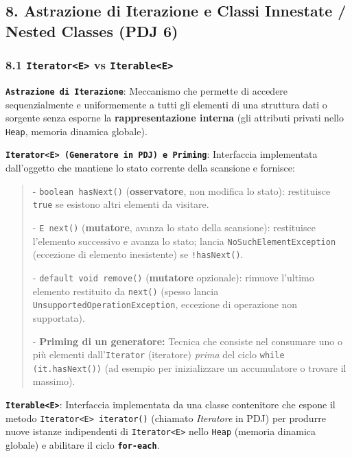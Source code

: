\subsection{8. Astrazione di Iterazione e Classi Innestate / Nested Classes (PDJ 6)}\label{8-astrazione-di-iterazione-e-classi-innestate-nested-classes-pdj-6}

\subsubsection{8.1 \texttt{Iterator<E>} vs \texttt{Iterable<E>}}\label{8-1-iterator-e-vs-iterable-e}

\textbf{\texttt{Astrazione di Iterazione}}: Meccanismo che permette di accedere sequenzialmente e uniformemente a tutti gli elementi di una struttura dati o sorgente senza esporne la \textbf{rappresentazione interna} (gli attributi privati nello \texttt{Heap}, memoria dinamica globale).

\textbf{\texttt{Iterator<E> (Generatore in PDJ) e Priming}}: Interfaccia implementata dall'oggetto che mantiene lo stato corrente della scansione e fornisce:

\begin{quote}\small



- \texttt{boolean hasNext()} (\textbf{osservatore}, non modifica lo stato): restituisce \texttt{true} se esistono altri elementi da visitare.

- \texttt{E next()} (\textbf{mutatore}, avanza lo stato della scansione): restituisce l'elemento successivo e avanza lo stato; lancia \texttt{NoSuchElementException} (eccezione di elemento inesistente) se \texttt{!hasNext()}.

- \texttt{default void remove()} (\textbf{mutatore} opzionale): rimuove l'ultimo elemento restituito da \texttt{next()} (spesso lancia \texttt{UnsupportedOperationException}, eccezione di operazione non supportata).

- \textbf{Priming di un generatore:} Tecnica che consiste nel consumare uno o più elementi dall'\texttt{Iterator} (iteratore) \emph{prima} del ciclo \texttt{while (it.hasNext())} (ad esempio per inizializzare un accumulatore o trovare il massimo).

\end{quote}

\textbf{\texttt{Iterable<E>}}: Interfaccia implementata da una classe contenitore che espone il metodo \texttt{Iterator<E> iterator()} (chiamato \emph{Iteratore} in PDJ) per produrre nuove istanze indipendenti di \texttt{Iterator<E>} nello \texttt{Heap} (memoria dinamica globale) e abilitare il ciclo \textbf{\texttt{for-each}}.

